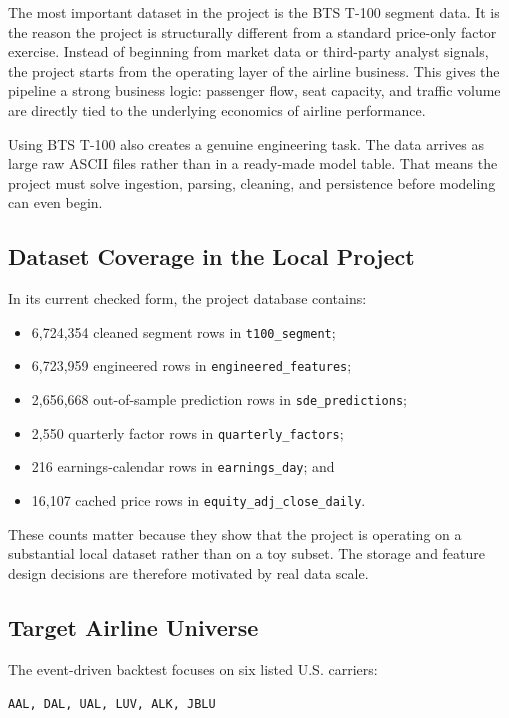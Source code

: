 \documentclass[11pt,a4paper]{article}
\begin{document}
The most important dataset in the project is the BTS T-100 segment data. It is
the reason the project is structurally different from a standard price-only
factor exercise. Instead of beginning from market data or third-party analyst
signals, the project starts from the operating layer of the airline business.
This gives the pipeline a strong business logic: passenger flow, seat capacity,
and traffic volume are directly tied to the underlying economics of airline
performance.

Using BTS T-100 also creates a genuine engineering task. The data arrives as
large raw ASCII files rather than in a ready-made model table. That means the
project must solve ingestion, parsing, cleaning, and persistence before
modeling can even begin.

\subsection{Dataset Coverage in the Local Project}

In its current checked form, the project database contains:

\begin{itemize}[leftmargin=*]
  \item 6,724,354 cleaned segment rows in \texttt{t100\_segment};
  \item 6,723,959 engineered rows in \texttt{engineered\_features};
  \item 2,656,668 out-of-sample prediction rows in \texttt{sde\_predictions};
  \item 2,550 quarterly factor rows in \texttt{quarterly\_factors};
  \item 216 earnings-calendar rows in \texttt{earnings\_day}; and
  \item 16,107 cached price rows in \texttt{equity\_adj\_close\_daily}.
\end{itemize}

These counts matter because they show that the project is operating on a
substantial local dataset rather than on a toy subset. The storage and feature
design decisions are therefore motivated by real data scale.

\subsection{Target Airline Universe}

The event-driven backtest focuses on six listed U.S. carriers:

\begin{center}
\texttt{AAL, DAL, UAL, LUV, ALK, JBLU}
\end{center}
\end{document}
